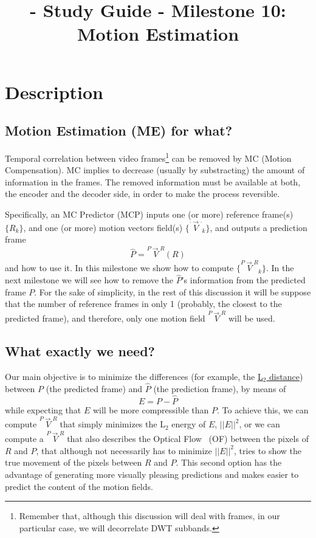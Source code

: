 
\title{\SM{} - Study Guide - Milestone 10: Motion Estimation}

\maketitle

\tableofcontents

\section{Description}

\subsection{Motion Estimation (ME) for what?}
Temporal correlation between video frames\footnote{Remember that,
  although this discussion will deal with frames, in our particular
  case, we will decorrelate DWT subbands.} can be removed by MC
(Motion Compensation). MC implies to decrease (usually by
substracting) the amount of information in the frames. The removed
information must be available at both, the encoder and the decoder
side, in order to make the process reversible.

Specifically, an MC Predictor (MCP) inputs one (or more) reference
frame(s) $\{R_k\}$, and one (or more) motion vectors field(s)
$\{\overset{\cdot\rightarrow\cdot}{V}_k\}$, and outputs a prediction
frame
\begin{equation}
  \hat{P} =  \overset{P\rightarrow R}{V}(R)
\end{equation}
and how to use it. In this milestone we show how to compute
$\{\overset{P\rightarrow R}{V}_k\}$. In the next milestone we will see
how to remove the $\hat{P}$'s information from the predicted frame
$P$. For the sake of simplicity, in the rest of this discussion it
will be suppose that the number of reference frames in only 1
(probably, the closest to the predicted frame), and therefore, only
one motion field $\overset{P\rightarrow R}{V}$ will be used.

\subsection{What exactly we need?}
Our main objective is to minimize the differences (for example, the
\href{https://en.wikipedia.org/wiki/Euclidean_distance}{L$_2$
  distance}) between $P$ (the predicted frame) and $\hat{P}$ (the
prediction frame), by means of
\begin{equation}
  E = P - \hat{P}
\end{equation}
while expecting that $E$ will be more compressible than $P$. To
achieve this, we can compute $\overset{P\rightarrow R}{V}$ that simply
minimizes the L$_2$ energy of $E$, $||E||^2$, or we can compute a
$\overset{P\rightarrow R}{V}$ that also describes the Optical
Flow~\cite{horn1981determining} (OF) between the pixels of $R$ and
$P$, that although not necessarily has to minimize $||E||^2$, tries to
show the true movement of the pixels between $R$ and $P$. This second
option has the advantage of generating more visually pleasing
predictions and makes easier to predict the content of the motion
fields.


